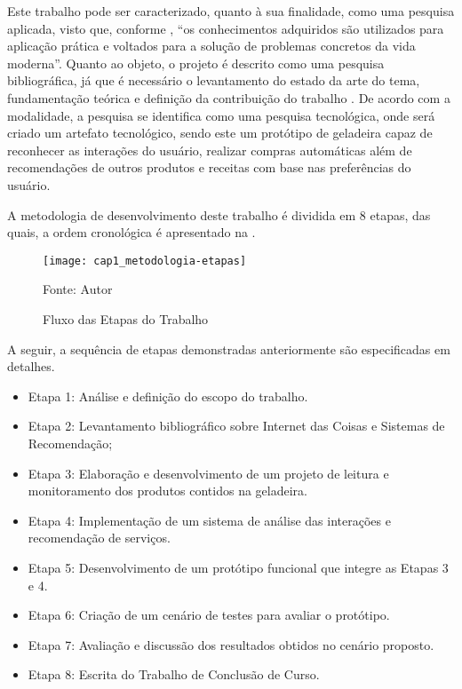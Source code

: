 Este trabalho pode ser caracterizado, quanto à sua finalidade, como uma pesquisa aplicada, visto que, conforme , ``os conhecimentos adquiridos são utilizados para aplicação prática e voltados para a solução de problemas concretos da vida moderna''. Quanto ao objeto, o projeto é descrito como uma pesquisa bibliográfica, já que é necessário o levantamento do estado da arte do tema, fundamentação teórica e definição da contribuição do trabalho \cite{Matias-Pereira2012}. De acordo com a modalidade, a pesquisa se identifica como uma pesquisa tecnológica, onde será criado um artefato tecnológico, sendo este um protótipo de geladeira capaz de reconhecer as interações do usuário, realizar compras automáticas além de recomendações de outros produtos e receitas com base nas preferências do usuário. 

A metodologia de desenvolvimento deste trabalho é dividida em 8 etapas, das quais, a ordem cronológica é apresentado na .

\begin{figure}[htb]
    
    \caption{Fluxo das Etapas do Trabalho}
    \texttt{[image: cap1\_metodologia-etapas]}
    \label{fig:cap1_metodologia-etapas}
    
    \footnotesize{Fonte: Autor}
\end{figure}

A seguir, a sequência de etapas demonstradas anteriormente são especificadas em detalhes.

\begin{itemize}\parskip -1pt
    \item Etapa 1: Análise e definição do escopo do trabalho.
	\item Etapa 2: Levantamento bibliográfico sobre Internet das Coisas e Sistemas de Recomendação;
	\item Etapa 3: Elaboração e desenvolvimento de um projeto de leitura e monitoramento dos produtos contidos na geladeira.
	\item Etapa 4: Implementação de um sistema de análise das interações e recomendação de serviços.
	\item Etapa 5: Desenvolvimento de um protótipo funcional que integre as Etapas 3 e 4.
	\item Etapa 6: Criação de um cenário de testes para avaliar o protótipo.
	\item Etapa 7: Avaliação e discussão dos resultados obtidos no cenário proposto.
	\item Etapa 8: Escrita do Trabalho de Conclusão de Curso.
\end{itemize}



